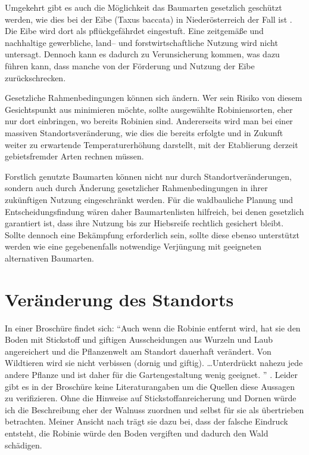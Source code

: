 \documentclass[twocolumn]{scrartcl}
\begin{document}
Umgekehrt gibt es auch die Möglichkeit das Baumarten gesetzlich geschützt
werden, wie dies bei der Eibe (Taxus baccata) in Niederösterreich der Fall ist
\citep{niederoesterreich2000Naturschutzgesetz,niederoesterreich2005artenschutzverordnung}.
Die Eibe wird dort als pflückgefährdet eingestuft. Eine zeitgemäße und
nachhaltige gewerbliche, land-- und forstwirtschaftliche Nutzung wird nicht
untersagt. Dennoch kann es dadurch zu Verunsicherung kommen, was dazu führen
kann, dass manche von der Förderung und Nutzung der Eibe zurückschrecken.

Gesetzliche Rahmenbedingungen können sich ändern. Wer sein Risiko von diesem
Gesichtspunkt aus minimieren möchte, sollte ausgewählte Robiniensorten, eher nur
dort einbringen, wo bereits Robinien sind. Andererseits wird man bei einer
massiven Standortsveränderung, wie dies die bereits erfolgte und in Zukunft
weiter zu erwartende Temperaturerhöhung darstellt, mit der Etablierung derzeit
gebietsfremder Arten rechnen müssen.

Forstlich genutzte Baumarten können nicht nur durch Standortveränderungen,
sondern auch durch Änderung gesetzlicher Rahmenbedingungen in ihrer zukünftigen
Nutzung eingeschränkt werden. Für die waldbauliche Planung und
Entscheidungsfindung wären daher Baumartenlisten hilfreich, bei denen gesetzlich
garantiert ist, dass ihre Nutzung bis zur Hiebsreife rechtlich gesichert bleibt.
Sollte dennoch eine Bekämpfung erforderlich sein, sollte diese ebenso
unterstützt werden wie eine gegebenenfalls notwendige Verjüngung mit geeigneten
alternativen Baumarten.

\section{Veränderung des Standorts}

In einer Broschüre findet sich: \enquote{Auch wenn die Robinie entfernt wird,
hat sie den Boden mit Stickstoff und giftigen Ausscheidungen aus Wurzeln und
Laub angereichert und die Pflanzenwelt am Standort dauerhaft verändert. Von
Wildtieren wird sie nicht verbissen (dornig und giftig). \dots Unterdrückt
nahezu jede andere Pflanze und ist daher für die Gartengestaltung wenig
geeignet.%
} \citep{oebf2019aliensAusDemGarten}. Leider gibt es in der Broschüre
keine Literaturangaben um die Quellen diese Aussagen zu verifizieren.
Ohne die Hinweise auf Stickstoffanreicherung und Dornen würde ich die
Beschreibung eher der Walnuss zuordnen und selbst für sie als
übertrieben betrachten. Meiner Ansicht nach trägt sie dazu bei, dass
der falsche Eindruck entsteht, die Robinie würde den Boden vergiften
und dadurch den Wald schädigen.
\end{document}
